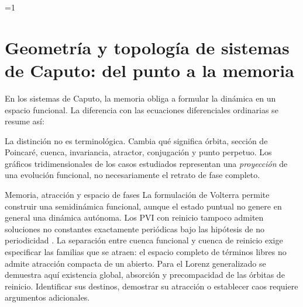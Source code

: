 \def\HAFOCaputoShowMemory{1}
\def\HAFOCaputoShowBasins{1}
\def\HAFOCaputoShowReturn{1}
\def\HAFOCaputoShowProtocol{1}
\ifdefined\HAFOCaputoBlockSelect
  \def\HAFOCaputoShowMemory{0}
  \def\HAFOCaputoShowBasins{0}
  \def\HAFOCaputoShowReturn{0}
  \def\HAFOCaputoShowProtocol{0}
  \ifdefined\HAFOCaputoBlockMemory
    \def\HAFOCaputoShowMemory{1}
  \fi
  \ifdefined\HAFOCaputoBlockBasins
    \def\HAFOCaputoShowBasins{1}
  \fi
  \ifdefined\HAFOCaputoBlockReturn
    \def\HAFOCaputoShowReturn{1}
  \fi
  \ifdefined\HAFOCaputoBlockProtocol
    \def\HAFOCaputoShowProtocol{1}
  \fi
\fi

\ifnum\HAFOCaputoShowMemory=1\relax
\section{Geometría y topología de sistemas de Caputo: del punto a la memoria}
\label{sec:geometria-topologia-caputo}

\HAFOCardMemory

En los sistemas de Caputo, la memoria obliga a formular la dinámica en un
espacio funcional. La diferencia con las ecuaciones diferenciales ordinarias
se resume así:

\begin{center}
\end{center}

La distinción no es terminológica. Cambia qué significa órbita, sección de
Poincaré, cuenca, invariancia, atractor, conjugación y punto perpetuo. Los
gráficos tridimensionales de los casos estudiados representan una
\emph{proyección} de una evolución funcional, no necesariamente el retrato de
fase completo.

\begin{hallazgo}{Memoria, atracción y espacio de fases}
La formulación de Volterra permite construir una semidinámica funcional,
aunque el estado puntual no genere en general una dinámica autónoma. Los
PVI con reinicio tampoco admiten soluciones no constantes exactamente
periódicas bajo las hipótesis de no periodicidad
\cite{CongTuan2017Nonlocal,DoanKloeden2021Semidynamical,
TavazoeiHaeri2009,KaslikSivasundaram2012}. La separación entre cuenca
funcional y cuenca de reinicio exige especificar las familias que se atraen:
el espacio completo de términos libres no admite atracción compacta de un
abierto. Para el Lorenz generalizado se demuestra aquí existencia global,
absorción y precompacidad de las órbitas de reinicio. Identificar sus
destinos, demostrar su atracción o establecer caos requiere argumentos
adicionales.
\end{hallazgo}


